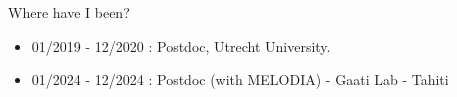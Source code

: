 \documentclass[usenames,dvipsnames,handout]{beamer}
\begin{document}
\begin{frame}{Where have I been?}
\begin{itemize}
        \vspace{-5.4cm}
         \item 01/2019 - 12/2020 : Postdoc, Utrecht University.
        \vspace{-4.4cm}
         \item 01/2024 - 12/2024 : Postdoc (with MELODIA) - Gaati Lab - Tahiti 
    \end{itemize}
\end{frame}
\end{document}
